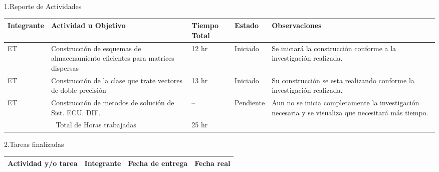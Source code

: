 \documentclass[12pt]{report}
\numberwithin{equation}{section}
\begin{document}
\begin{flushleft}

\large{1.Reporte de Actividades }\\


\begin{table}[H]
\begin{tabular}{|m{2cm}|m{4.5cm}|m{1.5cm}|m{1.5cm}|m{4.5cm}|}
\hline
\small{\textbf{Integrante}} &\small{ \textbf{Actividad u Objetivo}} &\small{ \textbf{Tiempo Total}} & \small{\textbf{Estado} }& \small{\textbf{Observaciones}}\\
\hline \hline
ET & Construcci\'on de esquemas de almacenamiento eficientes para matrices dispersas  & 12 hr & Iniciado & \small{Se iniciar\'a la construcci\'on conforme a la investigaci\'on realizada.}\\
\hline
ET & Construcci\'on de la clase que trate vectores de doble precisi\'on  & 13 hr & Iniciado & \small{Su construcci\'on se esta realizando conforme la investigaci\'on realizada. }\\
\hline
ET & Construcci\'on de metodos de soluci\'on de  Sist. ECU. DIF.  & -- & Pendiente & \small{Aun no se inicia completamente la investigaci\'on necesaria y se visualiza que necesitar\'a m\'as tiempo.}\\
\hline
\multicolumn{2}{|c|}{Total de Horas trabajadas} & 25 hr  & & \\
\hline 
\end{tabular}
\label{tabla: TABLA CE Actividades}
\end{table}



\large{2.Tareas finalizadas }\\

\begin{longtable}[H]{|m{5cm}|m{3cm}|m{3cm}|m{3cm}|} 
\hline
\small{\textbf{Actividad y/o tarea }} &\small{ \textbf{Integrante}} & \small{\textbf{Fecha de entrega}} & \small{\textbf{Fecha real}}\\
\hline \hline
\endfirsthead


\end{longtable}
\end{flushleft}
\end{document}
